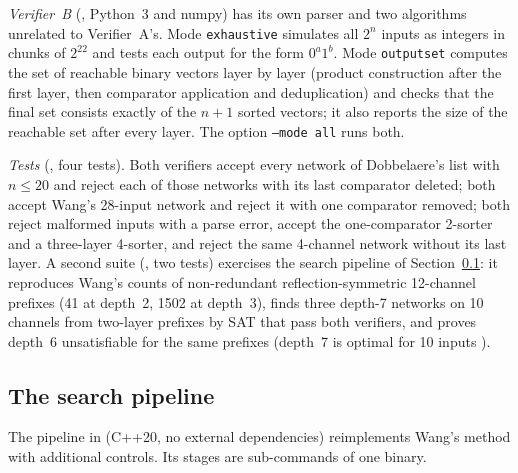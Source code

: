 \documentclass[11pt,a4paper]{article}
\theoremstyle{plain}
\theoremstyle{definition}
\theoremstyle{remark}
\newcommand{\dob}{Dobbelaere's list}
\begin{document}
\emph{Verifier~B} (, Python~3 and numpy) has its own parser and two algorithms unrelated to Verifier~A's. Mode \texttt{exhaustive} simulates all $2^n$ inputs as integers in chunks of $2^{22}$ and tests each output for the form $0^a1^b$. Mode \texttt{outputset} computes the set of reachable binary vectors layer by layer (product construction after the first layer, then comparator application and deduplication) and checks that the final set consists exactly of the $n+1$ sorted vectors; it also reports the size of the reachable set after every layer. The option \texttt{--mode all} runs both.

\emph{Tests} (, four tests). Both verifiers accept every network of \dob{} with $n\le 20$ and reject each of those networks with its last comparator deleted; both accept Wang's 28-input network and reject it with one comparator removed; both reject malformed inputs with a parse error, accept the one-comparator 2-sorter and a three-layer 4-sorter, and reject the same 4-channel network without its last layer. A second suite (, two tests) exercises the search pipeline of Section~\ref{sec:pipeline}: it reproduces Wang's counts of non-redundant reflection-symmetric 12-channel prefixes (41 at depth~2, 1502 at depth~3), finds three depth-7 networks on 10 channels from two-layer prefixes by SAT that pass both verifiers, and proves depth~6 unsatisfiable for the same prefixes (depth~7 is optimal for 10 inputs \cite{Parberry91}).

\subsection{The search pipeline}\label{sec:pipeline}

The pipeline in  (C++20, no external dependencies) reimplements Wang's method with additional controls. Its stages are sub-commands of one binary.
\end{document}
